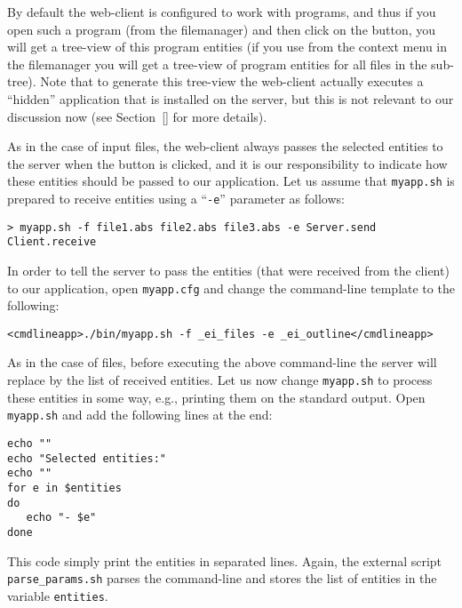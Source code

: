 By default the web-client is configured to work with \abs programs,
and thus if you open such a program (from the filemanager) and then
click on the  button, you will get a tree-view of this
program entities (if you use  from the context menu in
the filemanager you will get a tree-view of program entities for all
files in the sub-tree).
%
Note that to generate this tree-view the web-client actually executes a
``hidden'' application that is installed on the server, but this is
not relevant to our discussion now (see Section~\ref{} for more
details).

As in the case of input files, the web-client always passes the
selected entities to the server when the \applybutton button is
clicked, and it is our responsibility to indicate how these entities
should be passed to our application. 
%
Let us assume that \texttt{myapp.sh} is prepared to receive entities
using a ``\texttt{-e}'' parameter as follows:

\medskip
\begin{lstlisting}
> myapp.sh -f file1.abs file2.abs file3.abs -e Server.send Client.receive
\end{lstlisting}

\medskip 
\noindent
In order to tell the server to pass the entities (that were received
from the client) to our application, open \texttt{myapp.cfg} and
change the command-line template to the following:

\medskip
\begin{lstlisting}
<cmdlineapp>./bin/myapp.sh -f _ei_files -e _ei_outline</cmdlineapp>
\end{lstlisting}

\medskip
\noindent
As in the case of files, before executing the above command-line the
server will replace  by the list of received
entities.  Let us now change \texttt{myapp.sh} to process these
entities in some way, e.g., printing them on the standard output. Open
\texttt{myapp.sh} and add the following lines at the end:

\medskip
\begin{lstlisting}[style=script]
echo ""
echo "Selected entities:"
echo ""
for e in $entities 
do
   echo "- $e"
done
\end{lstlisting}

\medskip
\noindent
This code simply print the entities in separated lines. Again, the
external script \texttt{parse\_params.sh} parses the command-line and
stores the list of entities in the variable \texttt{entities}.


